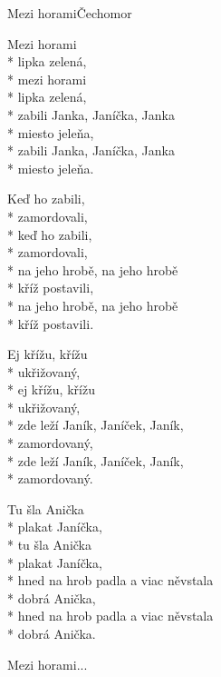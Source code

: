 \documentclass[10.5pt]{book}
\begin{document}
\begin{poem}{Mezi horami}{Čechomor}

\settowidth{\versewidth}{hned na hrob padla a viac něvstala}

Mezi horami\\*
lipka zelená,\\*
mezi horami\\*
lipka zelená,\\*
zabili Janka, Janíčka, Janka\\*
miesto jeleňa,\\*
zabili Janka, Janíčka, Janka\\*
miesto jeleňa.

Keď ho zabili,\\*
zamordovali,\\*
keď ho zabili,\\*
zamordovali,\\*
na jeho hrobě, na jeho hrobě\\*
kříž postavili,\\*
na jeho hrobě, na jeho hrobě\\*
kříž postavili.

Ej křížu, křížu\\*
ukřižovaný,\\*
ej křížu, křížu\\*
ukřižovaný,\\*
zde leží Janík, Janíček, Janík,\\*
zamordovaný,\\*
zde leží Janík, Janíček, Janík,\\*
zamordovaný.

\vfill\eject

Tu šla Anička\\*
plakat Janíčka,\\*
tu šla Anička\\*
plakat Janíčka,\\*
hned na hrob padla a viac něvstala\\*
dobrá Anička,\\*
hned na hrob padla a viac něvstala\\*
dobrá Anička.

Mezi horami... 
\end{poem}
\end{document}
